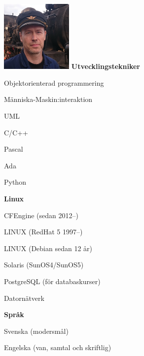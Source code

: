 \documentclass[a4paper,swedish,10pt]{article}
\begin{document}
\begin{minipage}[t]{0.24\textwidth}%
  \raggedleft%
  \vspace{-\topskip+1cm}
  \includegraphics[height=3.5cm]{bild.jpg}
  \textbf{Utvecklingstekniker}
  \begin{description}[nosep]
    \raggedleft\setlength\itemsep{0.1ex}\small%
  \item Objektorienterad programmering
  \item Människa-Maskin:interaktion
  \item UML
  \item C/C++
  \item Pascal
  \item Ada
  \item Python
  \end{description}
  \vspace{0.5cm}
  \textbf{Linux}
  \begin{description}[nosep,font=\sffamily\bfseries]
    \raggedleft\setlength\itemsep{0.1ex}\small%
  \item CFEngine (sedan 2012--)
  \item LINUX (RedHat 5 1997--)
  \item LINUX (Debian sedan 12 år)
  \item Solaris (SunOS4/SunOS5)
  \item PostgreSQL (för databaskurser)
  \item Datornätverk
  \end{description}
  \vspace{0.5cm}
  \textbf{Språk}
  \begin{description}[nosep,itemsep=0.1ex]
    \raggedleft\small%
  \item Svenska (modersmål)
  \item Engelska (van, samtal och skriftlig)
  \end{description}
\end{minipage}
\end{document}
